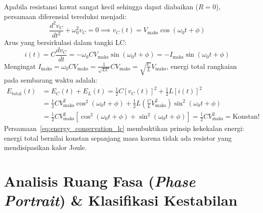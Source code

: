 \documentclass[11pt,a4paper]{article}
\theoremstyle{definition}
\begin{document}
Apabila resistansi kawat sangat kecil sehingga dapat diabaikan ($R = 0$), persamaan diferensial tereduksi menjadi:
\begin{equation}
    \frac{d^2 v_C}{dt^2} + \omega_0^2 v_C = 0 \implies v_C(t) = V_{\text{maks}} \cos(\omega_0 t + \phi)
    \label{eq:lc_tank_solution}
\end{equation}
Arus yang bersirkulasi dalam tangki LC:
\begin{equation}
    i(t) = C \frac{dv_C}{dt} = -\omega_0 C V_{\text{maks}} \sin(\omega_0 t + \phi) = -I_{\text{maks}} \sin(\omega_0 t + \phi)
\end{equation}
Mengingat $I_{\text{maks}} = \omega_0 C V_{\text{maks}} = \frac{1}{\sqrt{LC}} C V_{\text{maks}} = \sqrt{\frac{C}{L}} V_{\text{maks}}$, energi total rangkaian pada sembarang waktu adalah:
\begin{align}
    E_{\text{total}}(t) &= E_C(t) + E_L(t) = \frac{1}{2} C [v_C(t)]^2 + \frac{1}{2} L [i(t)]^2 \nonumber \\
    &= \frac{1}{2} C V_{\text{maks}}^2 \cos^2(\omega_0 t + \phi) + \frac{1}{2} L \left( \frac{C}{L} V_{\text{maks}}^2 \right) \sin^2(\omega_0 t + \phi) \nonumber \\
    &= \frac{1}{2} C V_{\text{maks}}^2 \left[ \cos^2(\omega_0 t + \phi) + \sin^2(\omega_0 t + \phi) \right] = \frac{1}{2} C V_{\text{maks}}^2 = \text{Konstan!}
    \label{eq:energy_conservation_lc}
\end{align}
Persamaan~\eqref{eq:energy_conservation_lc} membuktikan prinsip kekekalan energi: energi total bernilai konstan sepanjang masa karena tidak ada resistor yang mendisipasikan kalor Joule.

\section{Analisis Ruang Fasa (\textit{Phase Portrait}) \& Klasifikasi Kestabilan}
\end{document}
